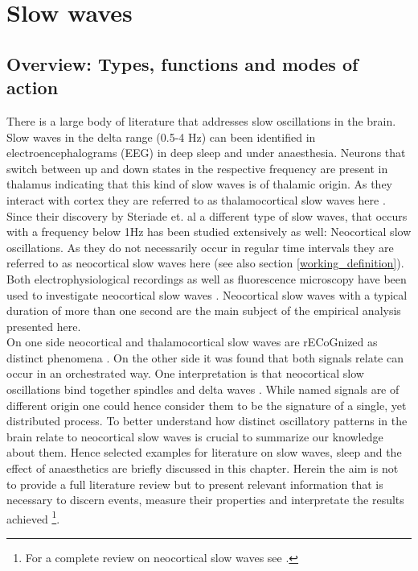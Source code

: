 
\chapter{Slow waves} %

\label{Chapter2} %
\label{review} %



\section{Overview: Types, functions and modes of action}
\label{overview_of_functions_and_types}
There is a large body of literature that addresses slow oscillations in the brain. Slow waves in the delta range (0.5-4 Hz) can been identified in electroencephalograms (EEG) in deep sleep and under anaesthesia. Neurons that switch between up and down states in the respective frequency are present in thalamus indicating that this kind of slow waves is of thalamic origin. As they interact with cortex they are referred to as thalamocortical slow waves here \parencite{steriade1984thalamus, brown2012control}. Since their discovery by Steriade et. al \parencite*{steriade1993novel} a different type of slow waves, that occurs with a frequency below 1Hz has been studied extensively as well: Neocortical slow oscillations. As they do not necessarily occur in regular time intervals they are referred to as neocortical slow waves here (see also section \ref{working_definition}). Both electrophysiological recordings as well as fluorescence microscopy have been used to investigate neocortical slow waves \parencite{niethard2018cortical, celotto2020analysis}. Neocortical slow waves with a typical duration of more than one second are the main subject of the empirical analysis presented here.\\
 On one side neocortical and thalamocortical slow waves are rECoGnized as distinct phenomena \parencite[p. 1110]{brown2012control}. On the other side it was found that both signals relate can occur in an orchestrated way. One interpretation is that neocortical slow oscillations bind together spindles and delta waves \parencite[p. 1110]{brown2012control}. While named signals are of different origin one could hence consider them to be the signature of a single, yet distributed process. To better understand how distinct oscillatory patterns in the brain relate to neocortical slow waves is crucial to summarize our knowledge about them. Hence selected examples for literature on slow waves, sleep and the effect of anaesthetics are briefly discussed in this chapter. Herein the aim is not to provide a full literature review but to present relevant information that is necessary to discern events, measure their properties and interpretate the results achieved \footnote{For a complete review on neocortical slow waves see \parencite{neske2016slow}.}.\\
